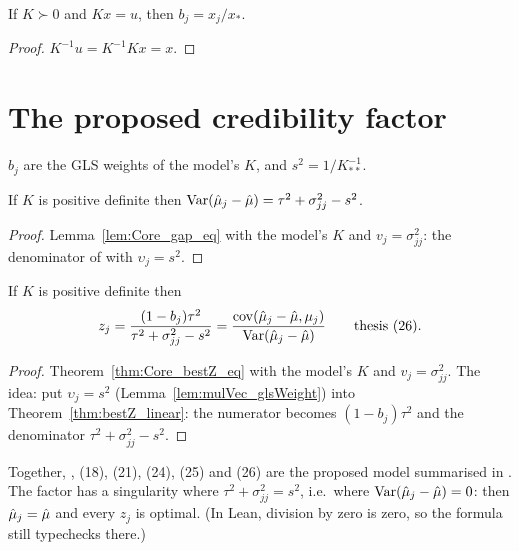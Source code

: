 \begin{lemma}\label{lem:Core_glsWeight_of_mulVec}
  \leanok
  If $K \succ 0$ and $Kx = u$, then $b_j = x_j / x_*$.
\end{lemma}
\begin{proof}
  \leanok
  $K^{-1}u = K^{-1}Kx = x$.
\end{proof}

\section{The proposed credibility factor}

\begin{definition}\label{def:Model.b}
  \leanok
  $b_j$ are the GLS weights of the model's $K$, and $s^2 = 1/K^{-1}_{**}$.
\end{definition}

\begin{lemma}\label{lem:gap_eq}
  \leanok
  If $K$ is positive definite then
  $\operatorname{Var}(\hat\mu_j - \hat\mu) = \tau^2 + \sigma_{jj}^2 - s^2$.
\end{lemma}
\begin{proof}
  \leanok
  Lemma~\ref{lem:Core_gap_eq} with the model's $K$ and $v_j = \sigma^2_{jj}$:
  the denominator of  with $\upsilon_j = s^2$.
\end{proof}

\begin{theorem}\label{thm:bestZ_eq}
  \leanok
  If $K$ is positive definite then
  \[
    z_j = \frac{(1-b_j)\tau^2}{\tau^2 + \sigma_{jj}^2 - s^2}
        = \frac{\operatorname{cov}(\hat\mu_j - \hat\mu, \mu_j)}{\operatorname{Var}(\hat\mu_j - \hat\mu)}
    \qquad\text{thesis~(26).}
  \]
\end{theorem}
\begin{proof}
  \leanok
  Theorem~\ref{thm:Core_bestZ_eq} with the model's $K$ and
  $v_j = \sigma^2_{jj}$. The idea: put $\upsilon_j = s^2$
  (Lemma~\ref{lem:mulVec_glsWeight}) into Theorem~\ref{thm:bestZ_linear}: the
  numerator becomes $(1-b_j)\tau^2$ and the denominator
  $\tau^2 + \sigma_{jj}^2 - s^2$.
\end{proof}

Together, , (18), (21), (24), (25) and (26) are the proposed model
summarised in . The factor has a singularity where
$\tau^2 + \sigma_{jj}^2 = s^2$, i.e.\ where $\operatorname{Var}(\hat\mu_j - \hat\mu) = 0$: then
$\hat\mu_j = \hat\mu$ and every $z_j$ is optimal. (In Lean, division by zero is
zero, so the formula still typechecks there.)

